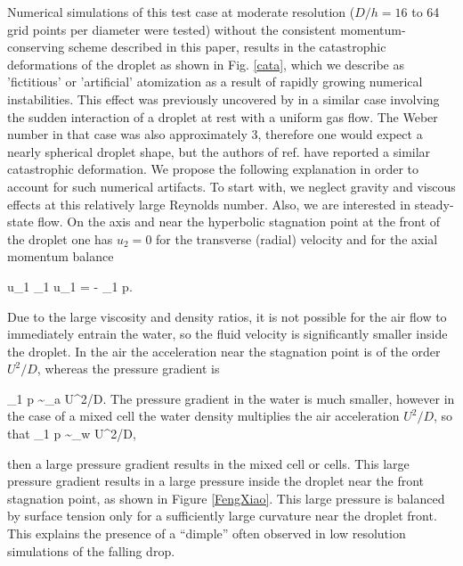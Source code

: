 Numerical simulations of this test case at moderate resolution ($D/h=16$ to 64 grid points per diameter were tested) without the consistent momentum-conserving scheme described in this paper, results in the catastrophic deformations of the droplet as shown in Fig. \ref{cata}, which we describe as 'fictitious' or 'artificial' atomization as a result of rapidly growing numerical instabilities. This effect was previously uncovered by \cite{Xiao:2014vs} in a similar case involving the sudden interaction of a droplet at rest with a uniform gas flow. The Weber number in that case was also approximately 3, therefore one would expect a nearly spherical droplet shape, but the authors of ref. \cite{Xiao:2014vs} have reported a similar catastrophic deformation. We propose the following explanation in order to account for such numerical artifacts. To start with, we neglect gravity and viscous effects at this relatively large Reynolds number. Also, we are interested in steady-state flow. On the axis and near the hyperbolic stagnation point at the front of the droplet one has $u_2=0$ for the transverse (radial) velocity and for the axial momentum balance

\be
u_1 \partial_1 u_1 = -  \rho \partial_1 p.
\nd

Due to the large viscosity and density ratios, it is not possible for the air flow to immediately entrain the water, so the fluid velocity is significantly smaller inside the droplet. In the air the acceleration near the stagnation point is of the order $U^2/D$, whereas the pressure gradient is

\be
\partial_1 p \sim \rho_{a} U^2/D.
\nd
The pressure gradient in the water is much smaller, however in the case of a mixed cell the water density multiplies the air acceleration $U^2/D$, so that
\be
\partial_1 p \sim \rho_{w} U^2/D,
\nd

then a large pressure gradient results in the mixed cell or cells. This large pressure gradient results in a large pressure inside the droplet near the front stagnation point, as shown in Figure \ref{FengXiao}. This large pressure is balanced by surface tension only for a sufficiently large curvature near the droplet front. This explains the presence of a ``dimple'' often observed in low resolution simulations of the falling drop. 

